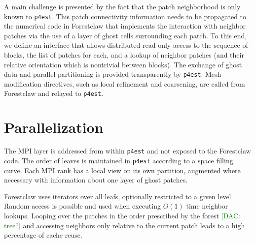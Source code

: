 \documentclass{IOS-Book-Article}     %
\newcommand{\comment}[1]{\textcolor{green}{[DAC: #1]}\xspace}
\newcommand{\forestclaw}{Forestclaw\xspace}
\newcommand{\pforest}{\texttt{p4est}\xspace}
\begin{document}
A main challenge is presented by the fact that the patch neighborhood
is only known to \pforest.  This patch connectivity information needs
to be propagated to the numerical code in \forestclaw that implements
the interaction with neighbor patches via the use of a layer of ghost
cells surrounding each patch.  To this end, we define an interface
that allows distributed read-only access to the sequence of blocks,
the list of patches for each, and a lookup of neighbor patches (and
their relative orientation which is nontrivial between blocks).  The
exchange of ghost data and parallel partitioning is provided
transparently by \pforest.  Mesh modification directives, such as
local refinement and coarsening, are called from \forestclaw and
relayed to \pforest.








\section{Parallelization}

The MPI layer is addressed from within \pforest and not exposed to the
\forestclaw code.  The order of leaves is maintained in \pforest according to a
space filling curve.  Each MPI rank has a local view on its own partition,
augmented where necessary with information about one layer of ghost patches.

\forestclaw uses iterators over all leafs, optionally restricted to a given
level.  Random access is possible and used when executing $O(1)$ time neighbor
lookups.  Looping over the patches in the order prescribed by the forest \comment{tree?} and
accessing neighbors only relative to the current patch leads to a high
percentage of cache reuse.
\end{document}
